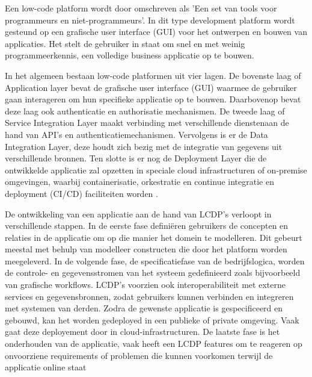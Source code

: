
Een low-code platform wordt door \textcite{Waszkowski2019} omschreven als 'Een set van tools voor programmeurs en niet-programmeurs'. In dit type development platform wordt gesteund op een grafische user interface (GUI) voor het ontwerpen en bouwen van applicaties. Het stelt de gebruiker in staat om snel en met weinig programmeerkennis, een volledige business applicatie op te bouwen.


In het algemeen bestaan low-code platformen uit vier lagen. De bovenste laag of Application layer bevat de grafische user interface (GUI) waarmee de gebruiker gaan interageren om hun specifieke applicatie op te bouwen. Daarbovenop bevat deze laag ook authenticatie en authorisatie mechanismen. De tweede laag of Service Integration Layer maakt verbinding met verschillende dienstenaan de hand van API's en authenticatiemechanismen. Vervolgens is er de Data Integration Layer, deze houdt zich bezig met de integratie van gegevens uit verschillende bronnen. Ten slotte is er nog de Deployment Layer die de ontwikkelde applicatie zal opzetten in speciale cloud infrastructuren of on-premise omgevingen, waarbij containerisatie, orkestratie en continue integratie en deployment (CI/CD) faciliteiten worden \autocite{Sahay2020}.

De ontwikkeling van een applicatie aan de hand van LCDP's verloopt in verschillende stappen. In de eerste fase definiëren gebruikers de concepten en relaties in de applicatie om op die manier het domein te modelleren. Dit gebeurt meestal met behulp van modelleer constructen die door het platform worden meegeleverd. In de volgende fase, de specificatiefase van de bedrijfslogica, worden de controle- en gegevensstromen van het systeem gedefinieerd zoals bijvoorbeeld van grafische workflows. LCDP's voorzien ook interoperabiliteit met externe services en gegevensbronnen, zodat gebruikers kunnen verbinden en integreren met systemen van derden. Zodra de gewenste applicatie is gespecificeerd en gebouwd, kan het worden gedeployed in een publieke of private omgeving. Vaak gaat deze deployement door in cloud-infrastructuren. De laatste fase is het onderhouden van de applicatie, vaak heeft een LCDP features om te reageren op onvoorziene requirements of problemen die kunnen voorkomen terwijl de applicatie online staat \autocite{Ruscio2022}


